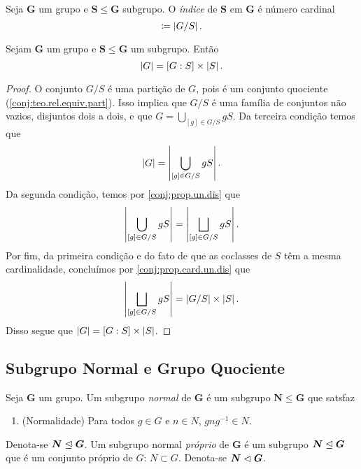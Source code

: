 \begin{defi}
Seja $\bm G$ um grupo e $\bm S \leq \bm G$ subgrupo. O \emph{índice} de $\bm S$ em $\bm G$ é número cardinal
	\begin{equation*}
	[G : S] \coloneqq \card{G/S}.
	\end{equation*}
\end{defi}

\begin{prop}
Sejam $\bm G$ um grupo e $\bm S \leq \bm G$ um subgrupo. Então
	\begin{equation*}
	\left\vert{G}\right\vert=[G:S] \times \left\vert{S}\right\vert.
	\end{equation*}
\end{prop}
\begin{proof}
O conjunto $G/S$ é uma partição de $G$, pois é um conjunto quociente (\ref{conj:teo.rel.equiv.part}). Isso implica que $G/S$ é uma família de conjuntos não vazios, disjuntos dois a dois, e que $G = \bigcup_{[g] \in G/S} gS$. Da terceira condição temos que
	\begin{equation*}
	\left\vert{G}\right\vert = \left\vert{\bigcup_{[g] \in G/S} gS}\right\vert.
	\end{equation*}
Da segunda condição, temos por \ref{conj:prop.un.dis} que
	\begin{equation*}
	\left\vert{\bigcup_{[g] \in G/S} gS}\right\vert = \left\vert{\bigsqcup_{[g] \in G/S} gS}\right\vert.
	\end{equation*}
Por fim, da primeira condição e do fato de que as coclasses de $S$ têm a mesma cardinalidade, concluímos por \ref{conj:prop.card.un.dis} que
	\begin{equation*}
	\left\vert{\bigsqcup_{[g] \in G/S} gS}\right\vert = \left\vert{G/S}\right\vert \times \left\vert{S}\right\vert.
	\end{equation*}
Disso segue que $\left\vert{G}\right\vert=[G:S] \times \left\vert{S}\right\vert$.
\end{proof}

\subsection{Subgrupo Normal e Grupo Quociente}

\begin{defi}
Seja $\bm G$ um grupo. Um subgrupo \emph{normal} de $\bm G$ é um subgrupo $\bm N \leq \bm G$ que satsfaz
	\begin{enumerate}[label={SGN\arabic*.}]
	\item \label{SGN} (Normalidade) Para todos $g \in G$ e $n \in N$, $gng^{-1} \in N$.
	\end{enumerate}
\noindent
Denota-se $\bm N \mathrel{\unlhd} \bm G$. Um subgrupo normal \emph{próprio} de $\bm G$ é um subgrupo $\bm N \mathrel{\unlhd} \bm G$ que é um conjunto próprio de $G$: $N \subset G$. Denota-se $\bm N \mathrel{\lhd} \bm G$.
\end{defi}

